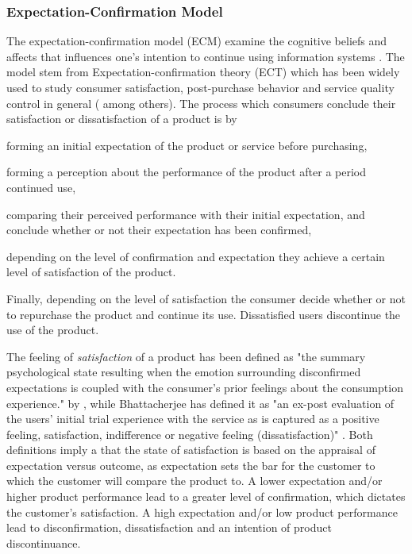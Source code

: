 \subsubsection{Expectation-Confirmation Model}
The expectation-confirmation model (ECM) examine the cognitive beliefs and affects that influences one's intention to continue using information systems \cite{Bhattacherjee2001a}. The model stem from Expectation-confirmation theory (ECT) which has been widely used to study consumer satisfaction, post-purchase behavior and service quality control in general (\cite{Anderson1993} \cite{Oliver1981} among others). The process which consumers conclude their satisfaction or dissatisfaction of a product is by \begin{enumerate*}[label=(\(\arabic*\))]
  \item forming an initial expectation of the product or service before purchasing,
  \item forming a perception about the performance of the product after a period continued use,
  \item comparing their perceived performance with their initial expectation, and conclude whether or not their expectation has been confirmed,
  \item depending on the level of confirmation and expectation they achieve a certain level of satisfaction of the product.
  \item Finally, depending on the level of satisfaction the consumer decide whether or not to repurchase the product and continue its use. Dissatisfied users discontinue the use of the product.
\end{enumerate*}

The feeling of \textit{satisfaction} of a product has been defined as "the summary psychological state resulting when the emotion surrounding disconfirmed expectations is coupled with the consumer's prior feelings about the consumption experience." by \cite{Oliver1981}, while Bhattacherjee has defined it as "an ex-post evaluation of the users’ initial trial experience with the service as is captured as a positive feeling, satisfaction, indifference or negative feeling (dissatisfaction)" \cite{Bhattacherjee2001}. Both definitions imply a that the state of satisfaction is based on the appraisal of expectation versus outcome, as expectation sets the bar for the customer to which the customer will compare the product to. A lower expectation and/or higher product performance lead to a greater level of confirmation, which dictates the customer's satisfaction. A high expectation and/or low product performance lead to disconfirmation, dissatisfaction and an intention of product discontinuance.

